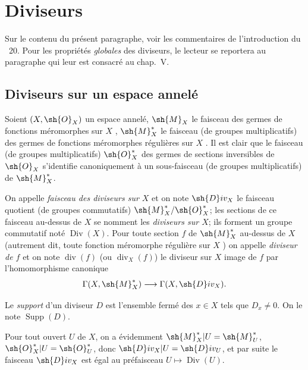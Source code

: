 \section{Diviseurs}
\label{section:IV.21}

Sur le contenu du présent paragraphe, voir les commentaires de l'introduction du \textsection~20.
Pour les propriétés \emph{globales} des diviseurs, le lecteur se reportera au paragraphe qui leur est consacré au chap.~V.

\subsection{Diviseurs sur un espace annelé}
\label{subsection:IV.21.1}
\label{IV.21.1}

\begin{env}[21.1.1]
\label{IV.21.1.1}
Soient $(X,\sh{O}_X)$ un espace annelé, $\sh{M}_X$ le faisceau des germes de fonctions méromorphes sur $X$ , $\sh{M}_X^*$ le faisceau (de groupes multiplicatifs) des germes de fonctions méromorphes régulières sur $X$ .
Il est clair que le faisceau (de groupes multiplicatifs) $\sh{O}_X^*$ des germes de sections inversibles de $\sh{O}_X$ s'identifie canoniquement à un sous-faisceau (de groupes multiplicatifs) de $\sh{M}_X^*$.
\end{env}

\begin{definition}[21.1.2]
\label{IV.21.1.2}
On appelle \emph{faisceau des diviseurs sur $X$} et on note $\sh{D}iv_X$ le faisceau quotient (de groupes commutatifs) $\sh{M}_X^*/\sh{O}_X^*$;
les sections de ce faisceau au-dessus de $X$ se nomment les \emph{diviseurs sur $X$}; ils forment un groupe commutatif noté $\operatorname{Div}(X)$.
Pour toute section $f$ de $\sh{M}_X^*$ au-dessus de $X$ (autrement dit, toute fonction méromorphe régulière sur $X$ ) on appelle \emph{diviseur de $f$} et on note $\operatorname{div}(f)$ (ou $\operatorname{div}_X(f)$) le diviseur sur $X$ image de $f$ par l'homomorphisme canonique
\[
  \Gamma(X,\sh{M}_X^*)\longrightarrow\Gamma(X,\sh{D}iv_X).
\]
\end{definition}


Le \emph{support} d'un diviseur $D$ est l'ensemble fermé des $x\in X$ tels que $D_x\neq0$.
On le note $\operatorname{Supp}(D)$.

Pour tout ouvert $U$ de $X$, on a évidemment $\sh{M}_X^*|U=\sh{M}_U^*$, $\sh{O}_X^*|U=\sh{O}_U^*$, donc $\sh{D}iv_X|U=\sh{D}iv_U$, et par suite le faisceau $\sh{D}iv_X$ est égal au préfaisceau $U\mapsto\operatorname{Div}(U)$.

